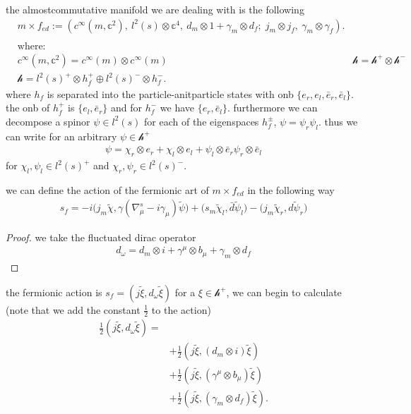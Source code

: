the almostcommutative manifold we are dealing with is the following
\begin{align}
    &m\times f_{ed} := \left(c^\infty(m,\mathbb{c}^2),\ l^2(s)\otimes
    \mathbb{c}^4,\
    d_m\otimes 1 +\gamma _m \otimes d_f;\; j_m\otimes j_f,\ \gamma_m\otimes
    \gamma _f\right).\\
    \nonumber\\
    &\text{where:} \nonumber \\
    &c^\infty(m,\mathbb{c}^2) = c^\infty(m) \otimes c^\infty(m)
    &\mathcal{h} = \mathcal{h}^+ \otimes \mathcal{h}^-\\
    &\mathcal{h} = l^2(s)^+ \otimes h_f^+ \oplus l^2(s)^- \otimes h_f^-.
\end{align}
where $h_f$ is separated into the particle-anitparticle states with onb $\{e_r,
e_l, \bar{e}_r, \bar{e}_l\}$. the onb of $h_f^+$ is $\{e_l, \bar{e}_r\}$ and
for $h_f^-$ we have $\{e_r, \bar{e}_l\}$. furthermore we can decompose a spinor
$\psi \in l^2(s)$ for each of the eigenspaces $h_f^\pm$, $\psi = \psi_r
\psi_l$. thus we can write for an arbitrary $\psi \in \mathcal{h}^+$
\begin{align}
    \psi = \chi_r \otimes e_r + \chi_l \otimes e_l + \psi_l \otimes \bar{e}_r
    \psi_r \otimes \bar{e}_l
\end{align}
for $\chi_l, \psi_l \in l^2(s)^+$ and $\chi_r, \psi_r \in l^2(s)^-$.
\begin{proposition}
    we can define the action of the fermionic art of $m\times f_{ed}$ in the
    following way
    \begin{align}
        s_f = -i\big(j_m\tilde{\chi}, \gamma(\nabla^s_\mu - i\gamma_\mu)
        \tilde{\psi}\big) + \big(s_m\tilde{\chi}_l, \bar{d}\tilde{\psi}_l\big) -
        \big(j_m\tilde{\chi}_r, d \tilde{\psi}_r\big)
    \end{align}
\end{proposition}
\begin{proof}
    we take the fluctuated dirac operator
    \begin{align}
        d_\omega = d_m \otimes i + \gamma^\mu \otimes b_\mu + \gamma_m \otimes
        d_f
    \end{align}
\end{proof}
the fermionic action is $s_f = (j\tilde{\xi}, d_\omega\tilde{\xi})$  for a $\xi
\in \mathcal{h}^+$, we can begin to calculate (note that we add the constant
$\frac{1}{2}$ to the action)
\begin{align}
    \frac{1}{2}(j\tilde{\xi}, d_\omega\tilde{\xi}) =&\\
        &+\frac{1}{2}(j\tilde{\xi}, (d_m \otimes i)\tilde{\xi})\label{eq:1}\\
        &+\frac{1}{2}(j\tilde{\xi}, (\gamma^\mu \otimes b_\mu)
        \tilde{\xi})\label{eq:2}\\
        &+\frac{1}{2}(j\tilde{\xi}, (\gamma_m\otimes
        d_f)\tilde{\xi})\label{eq:3}.
\end{align}
